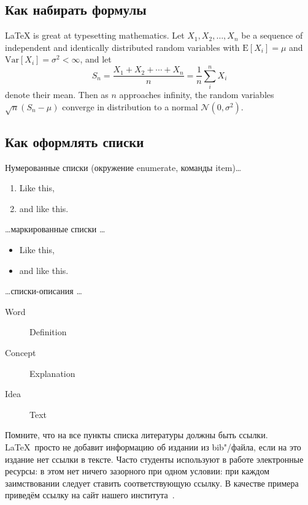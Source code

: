 \subsection{Как набирать формулы}

\LaTeX{} is great at typesetting mathematics. Let $X_1, X_2, \ldots, X_n$ be a sequence of independent and identically distributed random variables with $\text{E}[X_i] = \mu$ and $\text{Var}[X_i] = \sigma^2 < \infty$, and let
$$S_n = \frac{X_1 + X_2 + \cdots + X_n}{n}
      = \frac{1}{n}\sum_{i}^{n} X_i$$
denote their mean. Then as $n$ approaches infinity, the random variables $\sqrt{n}(S_n - \mu)$ converge in distribution to a normal $\mathcal{N}(0, \sigma^2)$.

\subsection{Как оформлять списки}

Нумерованные списки (окружение enumerate, команды item)…

\begin{enumerate}
  \item Like this,
  \item and like this.
\end{enumerate}

\dots маркированные списки \dots

\begin{itemize}
  \item Like this,
  \item and like this.
\end{itemize}

\dots списки-описания \dots

\begin{description}
  \item[Word] Definition
  \item[Concept] Explanation
  \item[Idea] Text
\end{description}

\Conc

Помните, что на все пункты списка литературы должны быть ссылки. \LaTeX\ просто не добавит информацию об издании из bib"/файла, если на это издание нет ссылки в тексте. Часто студенты используют в работе  электронные ресурсы: в этом нет ничего зазорного при одном условии: при каждом заимствовании следует ставить соответствующую ссылку. В качестве примера приведём ссылку на сайт нашего института~\autocite{mmcs}.

